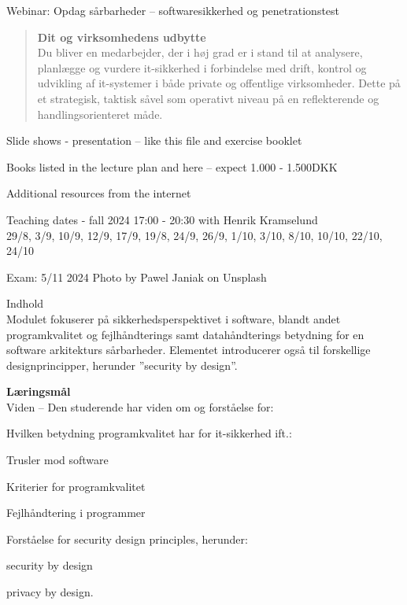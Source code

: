 \documentclass[Screen16to9,17pt]{foils}
\begin{document}
\mytitlepage
{}
{Webinar: Opdag sårbarheder -- softwaresikkerhed og penetrationstest}

\hlkprofiluk



\begin{quote}{\bf
Dit og virksomhedens udbytte}\\
Du bliver en medarbejder, der i høj grad er i stand til at analysere, planlægge og vurdere it-sikkerhed i forbindelse med drift, kontrol og udvikling af it-systemer i både private og offentlige virksomheder. Dette på et strategisk, taktisk såvel som operativt niveau på en reflekterende og handlingsorienteret måde.
\end{quote}



\begin{list2}
\item Slide shows - presentation -- like this file and exercise booklet
\item Books listed in the lecture plan and here -- expect 1.000 - 1.500DKK
\item Additional resources from the internet
\end{list2}

Teaching dates - fall 2024 17:00 - 20:30 with Henrik Kramselund \\
29/8, 3/9, 10/9, 12/9, 17/9, 19/8, 24/9, 26/9, 1/10, 3/10, 8/10, 10/10, 22/10, 24/10

Exam: 5/11 2024 \hskip 12cm Photo by Pawel Janiak on Unsplash



Indhold\\
Modulet fokuserer på sikkerhedsperspektivet i software, blandt andet programkvalitet og
fejlhåndterings samt datahåndterings betydning for en software arkitekturs sårbarheder.
Elementet introducerer også til forskellige designprincipper, herunder ”security by design”.

{\bf Læringsmål}\\
Viden -- Den studerende har viden om og forståelse for:
\begin{list2}
\item Hvilken betydning programkvalitet har for it-sikkerhed ift.:
\item Trusler mod software
\item Kriterier for programkvalitet
\item Fejlhåndtering i programmer
\item Forståelse for security design principles, herunder:
\item security by design
\item privacy by design.
\end{list2}
\end{document}

